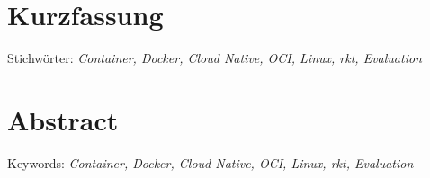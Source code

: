 
\chapter{Kurzfassung}
\label{chap:kurzfassung}

Stichwörter: \textit{Container, Docker, Cloud Native, OCI, Linux, rkt, Evaluation}
\begingroup
\let\cleardoublepage\relax
\chapter{Abstract}
\label{chap:Abstract}

Keywords: \textit{Container, Docker, Cloud Native, OCI, Linux, rkt, Evaluation}
\endgroup